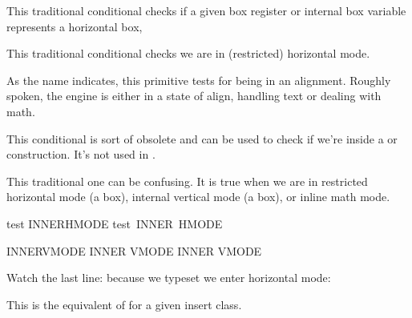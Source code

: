 {\getbuffer}

\stopnewprimitive

\startoldprimitive[title={\prm {ifhbox}}]

This traditional conditional checks if a given box register or internal box
variable represents a horizontal box,

\stopoldprimitive

\startoldprimitive[title={\prm {ifhmode}}]

This traditional conditional checks we are in (restricted) horizontal mode.

\stopoldprimitive

\startnewprimitive[title={\prm {ifinalignment}}]

As the name indicates, this primitive tests for being in an alignment. Roughly
spoken, the engine is either in a state of align, handling text or dealing with
math.

\stopnewprimitive

\startnewprimitive[title={\prm {ifincsname}}]

This conditional is sort of obsolete and can be used to check if we're inside a
 or  construction. It's not used in \CONTEXT.

\stopnewprimitive

\startoldprimitive[title={\prm {ifinner}}]

This traditional one can be confusing. It is true when we are in restricted
horizontal mode (a box), internal vertical mode (a box), or inline math mode.

\startbuffer
test \ifhmode \ifinner INNER\fi HMODE\fi\crlf
\hbox{test \ifhmode \ifinner INNER \fi HMODE\fi} \par

\ifvmode \ifinner INNER\fi VMODE \fi\crlf
\vbox{\ifvmode \ifinner INNER \fi VMODE\fi} \crlf
\vbox{\ifinner INNER \ifvmode VMODE \fi \fi} \par
\stopbuffer

\typebuffer

Watch the last line: because we typeset  we enter horizontal mode:

{\getbuffer}

\stopoldprimitive

\startnewprimitive[title={\prm {ifinsert}}]

This is the equivalent of  for a given insert class.

\stopnewprimitive

